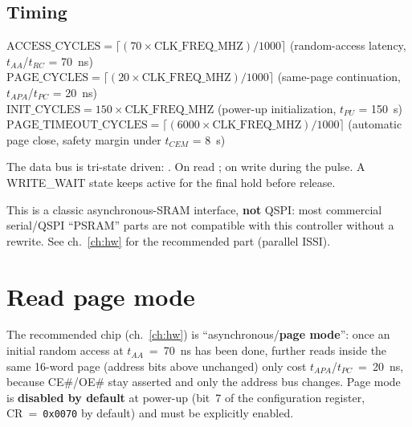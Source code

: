 \subsection{Timing}
\begin{fnspec}
$\text{ACCESS\_CYCLES}=\lceil (70\times \text{CLK\_FREQ\_MHZ})/1000\rceil$ \quad
(random-access latency, $t_{AA}$/$t_{RC}$ = 70~ns)\\[3pt]
$\text{PAGE\_CYCLES}=\lceil (20\times \text{CLK\_FREQ\_MHZ})/1000\rceil$ \quad
(same-page continuation, $t_{APA}$/$t_{PC}$ = 20~ns)\\[3pt]
$\text{INIT\_CYCLES}=150\times \text{CLK\_FREQ\_MHZ}$ \quad
(power-up initialization, $t_{PU}$ = 150~\textmu s)\\[3pt]
$\text{PAGE\_TIMEOUT\_CYCLES}=\lceil (6000\times \text{CLK\_FREQ\_MHZ})/1000\rceil$ \quad
(automatic page close, safety margin under $t_{CEM}$ = 8~\textmu s)
\end{fnspec}
The data bus is tri-state driven: . On read
; on write  during the  pulse. A WRITE\_WAIT
state keeps  active for the final hold before release.

\begin{fnwarn}
This is a classic asynchronous-SRAM interface, \textbf{not} QSPI: most commercial
serial/QSPI ``PSRAM'' parts are not compatible with this controller without a rewrite.
See ch.~\ref{ch:hw} for the recommended part (parallel ISSI).
\end{fnwarn}

\section{Read page mode}
\label{sec:pagemode}
The recommended chip (ch.~\ref{ch:hw}) is ``asynchronous/\textbf{page mode}'': once
an initial random access at $t_{AA}$~=~70~ns has been done, further reads inside the
same 16-word page (address bits above  unchanged) only cost
$t_{APA}$/$t_{PC}$~=~20~ns, because CE\#/OE\# stay asserted and only the address bus
changes. Page mode is \textbf{disabled by default} at power-up (bit~7 of the
configuration register, CR~=~\texttt{0x0070} by default) and must be explicitly
enabled.

